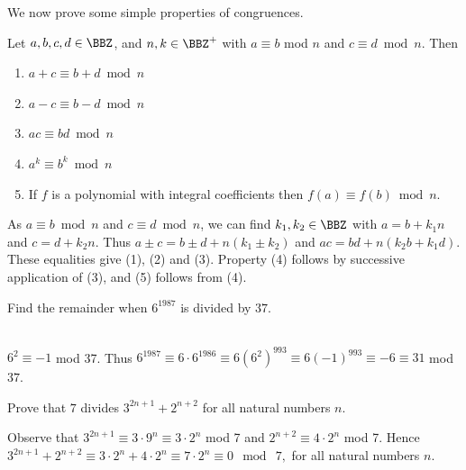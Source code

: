  We now prove some simple properties of congruences.
\begin{thm}
Let $a, b, c, d \in \BBZ$, and $n,k\in\BBZ^+$ with $a \equiv b$ mod $n$ and
$c \equiv d \bmod n$. Then
\begin{enumerate} \item $a + c \equiv b + d\bmod n$ \item
$a - c \equiv b - d\bmod n$ \item $ac \equiv bd\bmod n$ \item $a^k
\equiv b^k\bmod n$ \item If $f$ is a polynomial with integral
coefficients then $f(a) \equiv f(b)\bmod n$.
\end{enumerate}
\begin{pf} As $a \equiv b \bmod n$ and $c \equiv d\bmod n$, we can find
$k_1, k_2 \in \BBZ$ with $a = b + k_1n$ and $c = d + k_2n$. Thus
$a \pm c = b \pm d + n(k_1 \pm k_2)$ and $ac = bd + n(k_2b +
k_1d)$. These equalities give (1), (2) and (3). Property (4)
follows by successive application of (3), and (5) follows from
(4).
\end{pf}
\end{thm}
%

\begin{exa} Find the remainder when $6^{1987}$ is divided by
$37$. 
\begin{sol} \ \\
$6^2 \equiv -1$ mod 37. Thus $6^{1987}
\equiv 6\cdot 6^{1986} \equiv 6(6^2 )^{993} \equiv 6(-1)^{993}
\equiv -6 \equiv 31$ mod $37$.
\end{sol}
\end{exa} 

\begin{exer} 
Prove that $7$ divides $3^{2n + 1} + 2^{n + 2}$ for all natural numbers $n$. 
\vspace*{1.5in}
\begin{answer}
Observe that $3^{2n + 1} \equiv 3\cdot 9^n \equiv 3\cdot
2^n$ mod 7 and $2^{n + 2} \equiv 4\cdot 2^n$ mod 7. Hence
$ 3^{2n + 1} + 2^{n + 2} \equiv 3\cdot 2^n+4\cdot 2^n\equiv 7\cdot 2^n \equiv 0 \  \bmod  \ 7,$
for all
natural numbers $n.$
\end{answer}
\end{exer}

